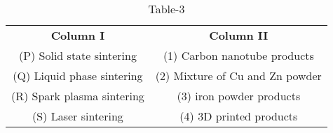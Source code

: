 \begin{table}[htbp]
  \centering
  \caption{Table-3}
  \label{tab:tables/table3.tex}
  \begin{tabular}{cc}

\textbf{Column I} & \textbf{Column II}\\
     (P) Solid state sintering & (1) Carbon nanotube products\\
     (Q) Liquid phase sintering & (2) Mixture of Cu and Zn powder\\
     (R) Spark plasma sintering & (3) iron powder products\\
     (S) Laser sintering & (4) 3D printed products

  \end{tabular}
\end{table}
